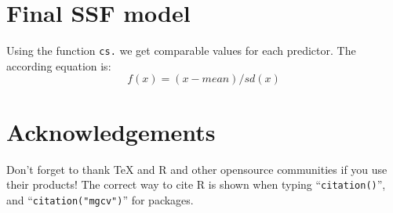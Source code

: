 \documentclass[11pt, a4paper]{article} %
\begin{document}
\section{Final SSF model}

Using the function \texttt{cs.} we get comparable values for each predictor. The according equation is: 
\[
\displaystyle f(x) = (x - mean)/sd(x)
\]

\section{Acknowledgements}
Don't forget to thank TeX and R and other opensource communities if you use their products! The correct way to cite R is shown when typing ``\texttt{citation()}'', and ``\texttt{citation("mgcv")}'' for packages.

{}

\end{document}
